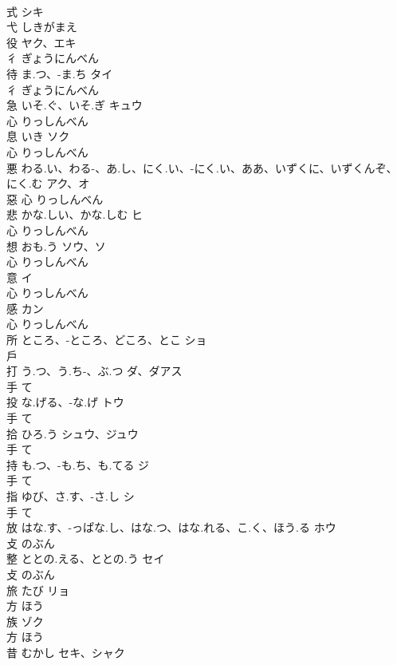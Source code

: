 \documentclass[8pt]{extreport}
\begin{document}
\begin{CJK}{UTF8}{min}
\\	式		シキ	
\\	弋		しきがまえ		
\\	役		ヤク、エキ	
\\	彳		ぎょうにんべん		
\\	待	ま.つ、-ま.ち	タイ	
\\	彳		ぎょうにんべん		
\\	急	いそ.ぐ、いそ.ぎ	キュウ	
\\	心		りっしんべん		
\\	息	いき	ソク	
\\	心		りっしんべん		
\\	悪	わる.い、わる-、あ.し、にく.い、-にく.い、ああ、いずくに、いずくんぞ、にく.む	アク、オ	
\\	惡	心		りっしんべん		
\\	悲	かな.しい、かな.しむ	ヒ	
\\	心		りっしんべん		
\\	想	おも.う	ソウ、ソ	
\\	心		りっしんべん		
\\	意		イ	
\\	心		りっしんべん		
\\	感		カン	
\\	心		りっしんべん		
\\	所	ところ、-ところ、どころ、とこ	ショ	
\\	戶				
\\	打	う.つ、う.ち-、ぶ.つ	ダ、ダアス	
\\	手		て		
\\	投	な.げる、-な.げ	トウ	
\\	手		て		
\\	拾	ひろ.う	シュウ、ジュウ	
\\	手		て		
\\	持	も.つ、-も.ち、も.てる	ジ	
\\	手		て		
\\	指	ゆび、さ.す、-さ.し	シ	
\\	手		て		
\\	放	はな.す、-っぱな.し、はな.つ、はな.れる、こ.く、ほう.る	ホウ	
\\	攴		のぶん		
\\	整	ととの.える、ととの.う	セイ	
\\	攴		のぶん		
\\	旅	たび	リョ	
\\	方		ほう		
\\	族		ゾク	
\\	方		ほう		
\\	昔	むかし	セキ、シャク	

\end{CJK}
\end{document}
